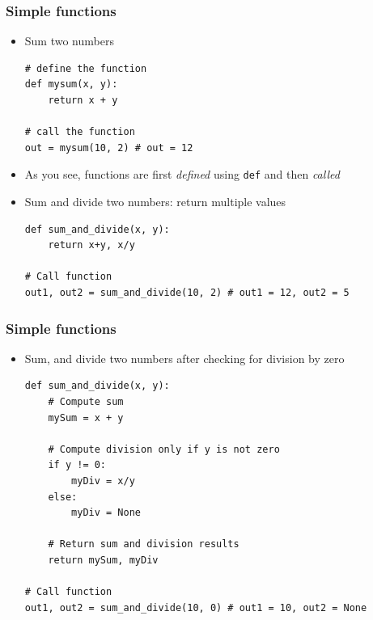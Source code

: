 \documentclass[xcolor=table]{beamer}
\begin{document}
\begin{frame}[fragile]
\frametitle{Simple functions}

\begin{itemize}[leftmargin=*]
\item<1->Sum two numbers
\begin{lstlisting}[style=python]
# define the function
def mysum(x, y):
    return x + y

# call the function
out = mysum(10, 2) # out = 12
\end{lstlisting}
    \item<2->As you see, functions are first \emph{defined} using \texttt{def} and then \emph{called}
\item<3->Sum and divide two numbers: return multiple values
\begin{lstlisting}[style=python]
def sum_and_divide(x, y):
    return x+y, x/y

# Call function
out1, out2 = sum_and_divide(10, 2) # out1 = 12, out2 = 5
\end{lstlisting}

\end{itemize}
\end{frame}

\begin{frame}[fragile]
\frametitle{Simple functions}

\begin{itemize}[leftmargin=*]
\item<1->Sum, and divide two numbers after checking for division by zero
\begin{lstlisting}[style=python]
def sum_and_divide(x, y):
    # Compute sum
    mySum = x + y
    
    # Compute division only if y is not zero
    if y != 0:
        myDiv = x/y
    else:
        myDiv = None
        
    # Return sum and division results
    return mySum, myDiv

# Call function
out1, out2 = sum_and_divide(10, 0) # out1 = 10, out2 = None
\end{lstlisting}
\end{itemize}

\end{frame}
\end{document}
